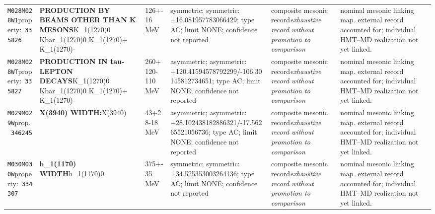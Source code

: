 \begin{landscape}
\begin{longtable}{L{1.85cm}L{4.45cm}L{2.35cm}L{4.05cm}L{3.35cm}L{7.15cm}}
\texttt{M028}\newline \texttt{M028W1}\newline property:\ \texttt{335826} & \textbf{PRODUCTION BY BEAMS OTHER THAN K MESONS}\newline K\_\allowbreak{}1(1270)0 \textbar{}\allowbreak{} Kbar\_\allowbreak{}1(1270)0 \textbar{}\allowbreak{} K\_\allowbreak{}1(1270)+ \textbar{}\allowbreak{} K\_\allowbreak{}1(1270)- & 126+-16\,MeV & symmetric; symmetric: ±16.081957783066429; type AC; limit NONE; confidence not reported & composite mesonic record\newline \emph{exhaustive record without promotion to comparison} & nominal mesonic linking map. external record accounted for; individual HMT--MD realization not yet linked. \\
\texttt{M028}\newline \texttt{M028WT}\newline property:\ \texttt{335827} & \textbf{PRODUCTION IN tau-LEPTON DECAYS}\newline K\_\allowbreak{}1(1270)0 \textbar{}\allowbreak{} Kbar\_\allowbreak{}1(1270)0 \textbar{}\allowbreak{} K\_\allowbreak{}1(1270)+ \textbar{}\allowbreak{} K\_\allowbreak{}1(1270)- & 260+120-110\,MeV & asymmetric; asymmetric: +120.41594578792299/-106.30145812734651; type AC; limit NONE; confidence not reported & composite mesonic record\newline \emph{exhaustive record without promotion to comparison} & nominal mesonic linking map. external record accounted for; individual HMT--MD realization not yet linked. \\
\texttt{M029}\newline \texttt{M029W}\newline prop.\ \texttt{346245} & \textbf{X(3940) WIDTH:}\newline X(3940) & 43+28-18\,MeV & asymmetric; asymmetric: +28.102438182886321/-17.56265521056736; type AC; limit NONE; confidence not reported & composite mesonic record\newline \emph{exhaustive record without promotion to comparison} & nominal mesonic linking map. external record accounted for; individual HMT--MD realization not yet linked. \\
\texttt{M030}\newline \texttt{M030W}\newline property:\ \texttt{334307} & \textbf{h\_\allowbreak{}1(1170) WIDTH}\newline h\_\allowbreak{}1(1170)0 & 375+-35\,MeV & symmetric; symmetric: ±34.525353003264136; type AC; limit NONE; confidence not reported & composite mesonic record\newline \emph{exhaustive record without promotion to comparison} & nominal mesonic linking map. external record accounted for; individual HMT--MD realization not yet linked. \\

\end{longtable}
\end{landscape}
